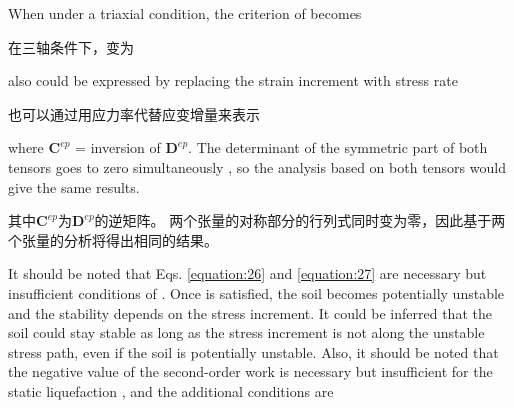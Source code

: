 \begin{ParaColumn}
    \noindent
    When under a triaxial condition, the criterion of  becomes

    \switchcolumn

    \noindent
    在三轴条件下，变为

    \switchcolumn*

     also could be expressed by replacing the strain increment with stress rate

    \switchcolumn

    也可以通过用应力率代替应变增量来表示

    \switchcolumn*

    \noindent
    where $\mathbf{C}^{e p}$ = inversion of $\mathbf{D}^{e p}$. The determinant of the symmetric part of both tensors goes to zero simultaneously \citep{Prunier2009}, so the analysis based on both tensors would give the same results.

    \switchcolumn

    \noindent
    其中$\mathbf{C}^{e p}$为$\mathbf{D}^{e p}$的逆矩阵。 两个张量的对称部分的行列式同时变为零\citep{Prunier2009}，因此基于两个张量的分析将得出相同的结果。

    \switchcolumn*

    It should be noted that Eqs. \ref{equation:26} and \ref{equation:27} are necessary but insufficient conditions of . Once  is satisfied, the soil becomes potentially unstable and the stability depends on the stress increment. It could be inferred that the soil could stay stable as long as the stress increment is not along the unstable stress path, even if the soil is potentially unstable. Also, it should be noted that the negative value of the second-order work is necessary but insufficient for the static liquefaction \citep{Chu2001}, and the additional conditions are \citep{Lade1992}


\end{ParaColumn}
